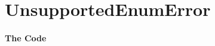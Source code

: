 \section{UnsupportedEnumError}\label{code:UnsupportedEnumError}

\autocite{TQUADRAT_ORG_FOUNDATION_UNSUPPORTEDENUMERROR}


\paragraph{The Code}\



